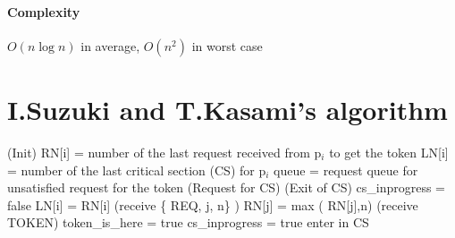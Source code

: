 \documentclass{article}
\begin{document}
\paragraph{Complexity}
$O(n\log n)$ in average, $O(n^2)$ in worst case

\section{I.Suzuki and T.Kasami's algorithm}


\begin{algorithm}
\Begin(Init){
	RN[i] = number of the last request received from p$_{i}$ to get the token\;
	LN[i] = number of the last critical section (CS) for p$_i$\;
	queue = request queue for unsatisfied request for the token
}
\Begin(Request for CS){
}
\Begin(Exit of CS){
	cs\_inprogress = false\;
	LN[i] = RN[i]
}
\Begin(receive \{ REQ, j, n\} ){
	RN[j] = max ( RN[j],n)\;
}
\Begin(receive TOKEN){
	token\_is\_here = true\;
	cs\_inprogress = true\;
	enter in CS\;
}
\end{algorithm}
\end{document}

